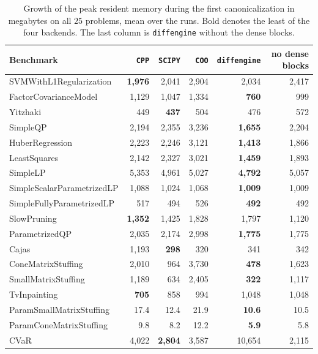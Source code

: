 \begin{table}[htbp]
\centering
\caption[Peak memory on all problems]{Growth of the peak resident memory during the first
canonicalization in megabytes on all $25$ problems, mean over the runs. Bold denotes the least of
the four backends. The last column is \texttt{diffengine} without the dense blocks.}
\label{tab:memory}
{\footnotesize
\setlength{\tabcolsep}{4pt}
\begin{tabular}{l rrrrr}
\toprule
Benchmark & \texttt{CPP} & \texttt{SCIPY} & \texttt{COO} & \texttt{diffengine} &
no dense blocks \\
\midrule
SVMWithL1Regularization & \textbf{1{,}976} & 2{,}041 & 2{,}904 & 2{,}034 & 2{,}417 \\
FactorCovarianceModel & 1{,}129 & 1{,}047 & 1{,}334 & \textbf{760} & 999 \\
Yitzhaki & 449 & \textbf{437} & 504 & 476 & 572 \\
SimpleQP & 2{,}194 & 2{,}355 & 3{,}236 & \textbf{1{,}655} & 2{,}204 \\
HuberRegression & 2{,}223 & 2{,}246 & 3{,}121 & \textbf{1{,}413} & 1{,}866 \\
LeastSquares & 2{,}142 & 2{,}327 & 3{,}021 & \textbf{1{,}459} & 1{,}893 \\
SimpleLP & 5{,}353 & 4{,}961 & 5{,}027 & \textbf{4{,}792} & 5{,}057 \\
SimpleScalarParametrizedLP & 1{,}088 & 1{,}024 & 1{,}068 & \textbf{1{,}009} & 1{,}009 \\
SimpleFullyParametrizedLP & 517 & 494 & 526 & \textbf{492} & 492 \\
SlowPruning & \textbf{1{,}352} & 1{,}425 & 1{,}828 & 1{,}797 & 1{,}120 \\
ParametrizedQP & 2{,}035 & 2{,}174 & 2{,}998 & \textbf{1{,}775} & 1{,}775 \\
Cajas & 1{,}193 & \textbf{298} & 320 & 341 & 342 \\
ConeMatrixStuffing & 2{,}010 & 964 & 3{,}730 & \textbf{478} & 1{,}623 \\
SmallMatrixStuffing & 1{,}189 & 634 & 2{,}405 & \textbf{322} & 1{,}117 \\
TvInpainting & \textbf{705} & 858 & 994 & 1{,}048 & 1{,}048 \\
ParamSmallMatrixStuffing & 17.4 & 12.4 & 21.9 & \textbf{10.6} & 10.5 \\
ParamConeMatrixStuffing & 9.8 & 8.2 & 12.2 & \textbf{5.9} & 5.8 \\
CVaR & 4{,}022 & \textbf{2{,}804} & 3{,}587 & 10{,}654 & 2{,}115 \\

\end{tabular}}
\end{table}
